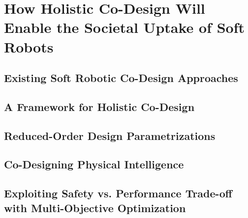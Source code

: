 \chapter{How Holistic Co-Design Will Enable the Societal Uptake of Soft Robots}\label{chp:apx:holisticcodesign}
\section{Existing Soft Robotic Co-Design Approaches}
\section{A Framework for Holistic Co-Design}
\section{Reduced-Order Design Parametrizations}
\section{Co-Designing Physical Intelligence}
\section{Exploiting Safety vs. Performance Trade-off with Multi-Objective Optimization}